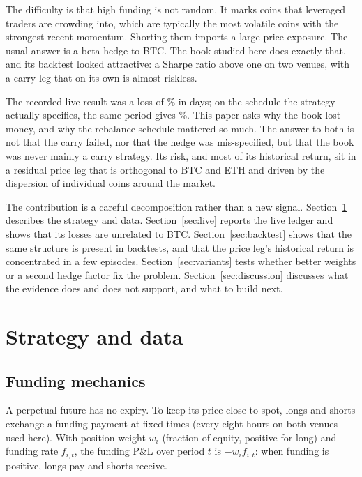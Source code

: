 \documentclass[11pt,a4paper]{article}
\begin{document}
The difficulty is that high funding is not random. It marks coins that leveraged
traders are crowding into, which are typically the most volatile coins with the
strongest recent momentum. Shorting them imports a large price exposure. The usual
answer is a beta hedge to BTC. The book studied here does exactly that, and its
backtest looked attractive: a Sharpe ratio above one on two venues, with a carry leg
that on its own is almost riskless.

The recorded live result was a loss of \LiveLoss\% in \LiveDays{} days; on the
schedule the strategy actually specifies, the same period gives \CleanTotal\%. This
paper asks why the book lost money, and why the rebalance schedule mattered so much.
The answer to both is not that the carry failed, nor that the hedge was mis-specified,
but that the book was never mainly a carry strategy. Its risk, and most of its historical
return, sit in a residual price leg that is orthogonal to BTC and ETH and driven by
the dispersion of individual coins around the market.

The contribution is a careful decomposition rather than a new signal. Section~\ref{sec:setup}
describes the strategy and data. Section~\ref{sec:live} reports the live ledger and
shows that its losses are unrelated to BTC. Section~\ref{sec:backtest} shows that the
same structure is present in backtests, and that the price leg's historical return is
concentrated in a few episodes. Section~\ref{sec:variants} tests whether better weights
or a second hedge factor fix the problem. Section~\ref{sec:discussion} discusses what
the evidence does and does not support, and what to build next.

\section{Strategy and data}\label{sec:setup}

\subsection{Funding mechanics}

A perpetual future has no expiry. To keep its price close to spot, longs and shorts
exchange a funding payment at fixed times (every eight hours on both venues used
here). With position weight $w_i$ (fraction of equity, positive for long) and funding
rate $f_{i,t}$, the funding P\&L over period $t$ is $-w_i f_{i,t}$: when funding is
positive, longs pay and shorts receive.
\end{document}

